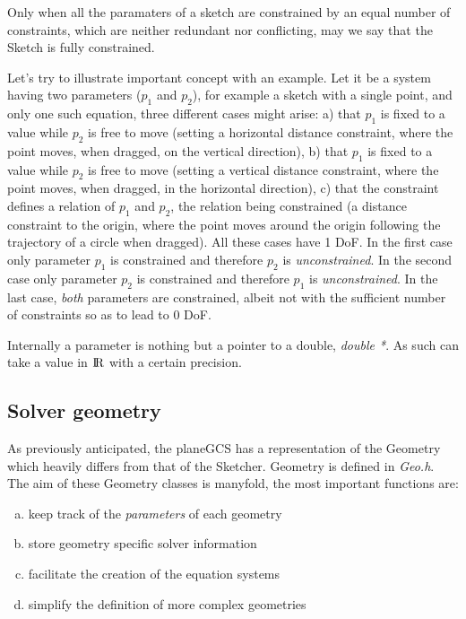 \documentclass[12pt,twoside,a4paper]{book}
\begin{document}
    Only when all the paramaters of a sketch are constrained by an equal number of constraints, which are neither redundant nor conflicting, may we say that the Sketch is fully constrained.

    Let's try to illustrate important concept with an example. Let it be a system having two parameters ($p_1$ and $p_2$), for example a sketch with a single point, and only one such equation, three different cases might arise: a) that $p_1$ is fixed to a value while $p_2$ is free to move (setting a horizontal distance constraint, where the point moves, when dragged, on the vertical direction), b) that $p_1$ is fixed to a value while $p_2$ is free to move (setting a vertical distance constraint, where the point moves, when dragged, in the horizontal direction), c) that the constraint defines a relation of $p_1$ and $p_2$, the relation being constrained (a distance constraint to the origin, where the point moves around the origin following the trajectory of a circle when dragged). All these cases have 1 DoF. In the first case only parameter $p_1$ is constrained and therefore $p_2$ is \emph{unconstrained}. In the second case only parameter $p_2$ is constrained and therefore $p_1$ is \emph{unconstrained}. In the last case, \emph{both} parameters are constrained, albeit not with the sufficient number of constraints so as to lead to 0 DoF.

    Internally a parameter is nothing but a pointer to a double, \emph{double *}. As such can take a value in ${\rm I\!R}$ with a certain precision.

    \subsection{Solver geometry}
    \label{sec:solvergeometry}
    As previously anticipated, the planeGCS has a representation of the Geometry which heavily differs from that of the Sketcher. Geometry is defined in \emph{Geo.h}. The aim of these Geometry classes is manyfold, the most important functions are:

    \begin{enumerate}[a)]
    \item keep track of the \emph{parameters} of each geometry
    \item store geometry specific solver information
    \item facilitate the creation of the equation systems
    \item simplify the definition of more complex geometries
    \end{enumerate}
\end{document}

